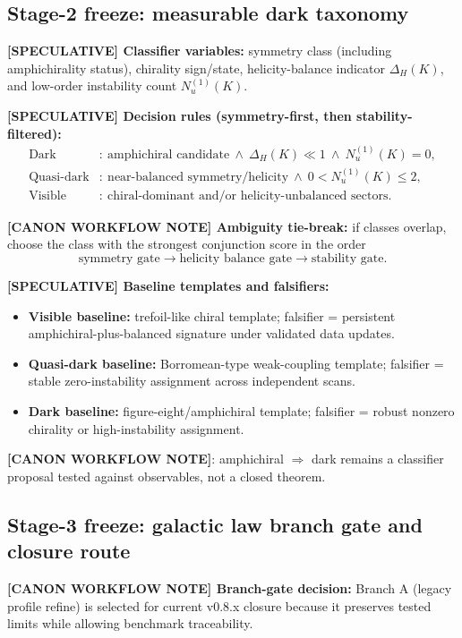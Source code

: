 \subsection{Stage-2 freeze: measurable dark taxonomy}
\textbf{[SPECULATIVE] Classifier variables:}
symmetry class (including amphichirality status), chirality sign/state, helicity-balance indicator $\Delta_H(K)$, and low-order instability count $N_u^{(1)}(K)$.

\textbf{[SPECULATIVE] Decision rules (symmetry-first, then stability-filtered):}
\begin{align}
    \text{Dark}
    &:\ \text{amphichiral candidate}
    \ \wedge\
    \Delta_H(K)\ll 1
    \ \wedge\
    N_u^{(1)}(K)=0,\\
    \text{Quasi-dark}
    &:\ \text{near-balanced symmetry/helicity}
    \ \wedge\
    0 < N_u^{(1)}(K)\le 2,\\
    \text{Visible}
    &:\ \text{chiral-dominant and/or helicity-unbalanced sectors}.
\end{align}

\textbf{[CANON WORKFLOW NOTE] Ambiguity tie-break:}
if classes overlap, choose the class with the strongest conjunction score in the order
\[
\text{symmetry gate} \rightarrow \text{helicity balance gate} \rightarrow \text{stability gate}.
\]

\textbf{[SPECULATIVE] Baseline templates and falsifiers:}
\begin{itemize}
    \item \textbf{Visible baseline:} trefoil-like chiral template; falsifier = persistent amphichiral-plus-balanced signature under validated data updates.
    \item \textbf{Quasi-dark baseline:} Borromean-type weak-coupling template; falsifier = stable zero-instability assignment across independent scans.
    \item \textbf{Dark baseline:} figure-eight/amphichiral template; falsifier = robust nonzero chirality or high-instability assignment.
\end{itemize}

\textbf{[CANON WORKFLOW NOTE]}:
amphichiral $\Rightarrow$ dark remains a classifier proposal tested against observables, not a closed theorem.

\subsection{Stage-3 freeze: galactic law branch gate and closure route}
\textbf{[CANON WORKFLOW NOTE] Branch-gate decision:} Branch A (legacy profile refine) is selected for current v0.8.x closure because it preserves tested limits while allowing benchmark traceability.

